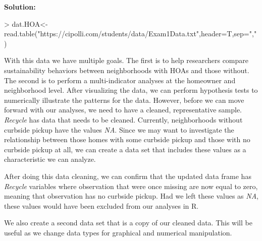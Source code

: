 \documentclass{article}
\begin{document}
\textbf{Solution:}
\begin{Schunk}
\begin{Sinput}
> dat.HOA<-read.table("https://cipolli.com/students/data/Exam1Data.txt",header=T,sep=",")
\end{Sinput}
\end{Schunk}

With this data we have multiple goals. The first is to help researchers compare sustainability behaviors between neighborhoods with HOAs and those without. The second is to perform a multi-indicator analyses at the homeowner and neighborhood level. After visualizing the data, we can perform hypothesis tests to numerically illustrate the patterns for the data. However, before we can move forward with our analyses, we need to have a cleaned, representative sample.
\\
\textit{Recycle} has data that needs to be cleaned. Currently, neighborhoods without curbside pickup have the values \textit{NA}. Since we may want to investigate the relationship between those homes with some curbside pickup and those with no curbside pickup at all, we can create a data set that includes these values as a characteristic we can analyze. 

\begin{Schunk}
\end{Schunk}

After doing this data cleaning, we can confirm that the updated data frame has \textit{Recycle} variables where observation that were once missing are now equal to zero, meaning that observation has no curbside pickup. Had we left these values as \textit{NA}, these values would have been excluded from our analyses in R. 


We also create a second data set that is a copy of our cleaned data. This will be useful as we change data types for graphical and numerical manipulation. 
\end{document}
